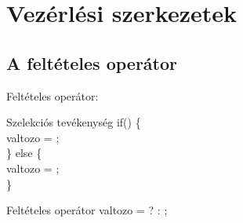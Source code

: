 \documentclass[usenames,dvipsnames,aspectratio=169]{beamer}
\begin{document}
\section{Vezérlési szerkezetek}
\subsection{A feltételes operátor}
\begin{frame}
  Feltételes operátor: 
  \begin{exampleblock}{Szelekciós tevékenység}
    if() \{\\
    \hspace{0.5cm} valtozo = ;\\
    \} else \{\\
    \hspace{0.5cm} valtozo = ;\\
    \}
  \end{exampleblock}
  \begin{exampleblock}{Feltételes operátor}
    valtozo =  ?  : ;
  \end{exampleblock}
\end{frame}

\begin{frame}
  \begin{exampleblock}{}
    \tiny
    
  \end{exampleblock}
  \begin{columns}[T]
      \begin{exampleblock}{}
        \tiny
        \vspace{-.2cm}
        
        \vspace{-.2cm}
      \end{exampleblock}
      \begin{exampleblock}{}
        \tiny
        \vspace{-.2cm}
        
        \vspace{-.2cm}
      \end{exampleblock}
  \end{columns}
\end{frame}
\end{document}
